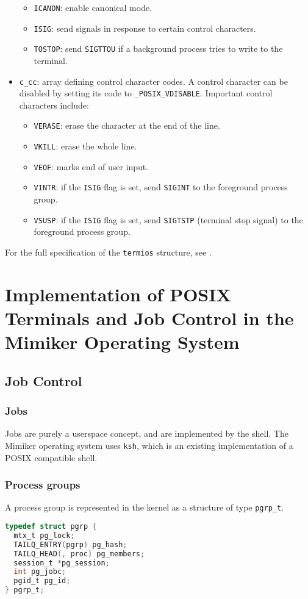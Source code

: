 \documentclass[shortabstract, manyadvisors, english, mgr]{iithesis}
\begin{document}
\begin{itemize}
\begin{itemize}
  \item \texttt{ICANON}: enable canonical mode.
  \item \texttt{ISIG}: send signals in response to certain control characters.
  \item \texttt{TOSTOP}: send \texttt{SIGTTOU} if a background process tries to
    write to the terminal.
  \end{itemize}
\item \texttt{c\_cc}: array defining control character codes. A control
  character can be disabled by setting its code to \texttt{\_POSIX\_VDISABLE}.
  Important control characters include:
  \begin{itemize}
  \item \texttt{VERASE}: erase the character at the end of the line.
  \item \texttt{VKILL}: erase the whole line.
  \item \texttt{VEOF}: marks end of user input.
  \item \texttt{VINTR}: if the \texttt{ISIG} flag is set, send \texttt{SIGINT}
    to the foreground process group.
  \item \texttt{VSUSP}: if the \texttt{ISIG} flag is set, send \texttt{SIGTSTP}
    (terminal stop signal) to the foreground process group.
  \end{itemize}
\end{itemize}
For the full specification of the \texttt{termios} structure, see
\cite{termios}.

\chapter{Implementation of POSIX Terminals and Job Control in the Mimiker
  Operating System}
\section{Job Control}
\subsection{Jobs}
Jobs are purely a userspace concept, and are implemented by the shell. The
Mimiker operating system uses \texttt{ksh}, which is an existing implementation
of a POSIX compatible shell.
\subsection{Process groups}
A process group is represented in the kernel as a structure of type \texttt{pgrp\_t}.
\begin{lstlisting}[language=C,
caption={\texttt{include/sys/proc.h}: definition of \texttt{pgrp\_t}.}]
typedef struct pgrp {
  mtx_t pg_lock;
  TAILQ_ENTRY(pgrp) pg_hash;
  TAILQ_HEAD(, proc) pg_members;
  session_t *pg_session;
  int pg_jobc;
  pgid_t pg_id;
} pgrp_t;
\end{lstlisting}
\end{document}
